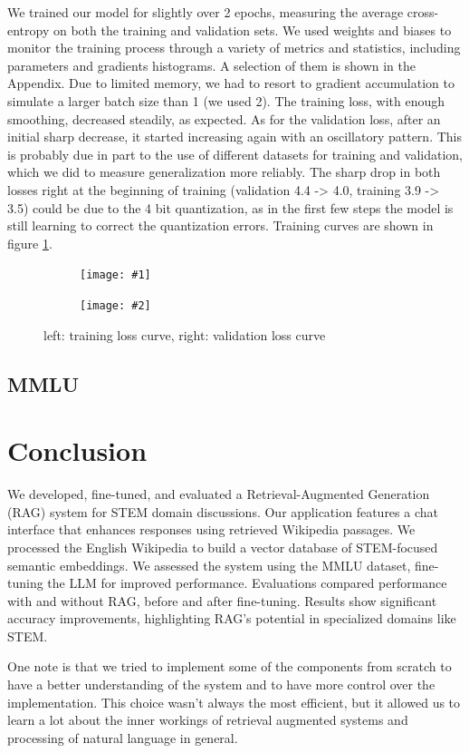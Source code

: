 \documentclass[11pt]{article}
\newcommand{\sideBySideImages}[5]{%
    \begin{figure}[ht]
        \centering
        \begin{subfigure}{#3\linewidth}
            \centering
            \texttt{[image: \#1]}
        \end{subfigure}%
        \hfill%
        \begin{subfigure}{#3\linewidth}
            \centering
            \texttt{[image: \#2]}
        \end{subfigure}
        \caption{#5}
        \label{#4}
    \end{figure}
}
\begin{document}
We trained our model for slightly over 2 epochs, measuring the average cross-entropy on both the training and validation sets. We used weights
and biases to monitor the training process through a variety of metrics and statistics, including parameters and gradients histograms. A selection of them 
is shown in the Appendix.
Due to limited memory, we had to resort to gradient accumulation to simulate a larger batch size than 1 (we used 2). The training loss, 
with enough smoothing, decreased steadily, as expected. As for the validation loss, after an initial sharp decrease, it started increasing
again with an oscillatory pattern. This is probably due in part to the use of different datasets for training and validation, which we did
to measure generalization more reliably. The sharp drop in both losses right at the beginning of training (validation 4.4 -> 4.0, training 3.9 -> 3.5) could be due to
 the 4 bit quantization, as in the first few steps the model is still learning to correct the quantization errors. Training curves are shown in figure \ref{fig:training_curves}.

\sideBySideImages{figures/train-loss.png}{figures/val-loss.png}{0.48}{fig:training_curves}{left: training loss curve, right: validation loss curve}

\subsection{MMLU}

\section{Conclusion}
We developed, fine-tuned, and evaluated a Retrieval-Augmented Generation (RAG) 
system for STEM domain discussions. Our application features a chat interface 
that enhances responses using retrieved Wikipedia passages. We processed the 
English Wikipedia to build a vector database of STEM-focused semantic 
embeddings. 
We assessed the system using the MMLU 
dataset, fine-tuning the LLM for improved performance. Evaluations compared 
performance with and without RAG, before and after fine-tuning.
Results show significant accuracy improvements, highlighting RAG's potential 
in specialized domains like STEM.

One note is that we tried to implement some of the components from scratch
to have a better understanding of the system and to have more control over the
implementation.
This choice wasn't always the most efficient, but it allowed us to learn a lot
about the inner workings of retrieval augmented systems and processing of natural 
language in general. 
\end{document}
